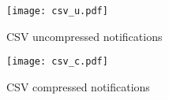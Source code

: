 
\begin{figure}
\noindent\begin{minipage}{.5\textwidth}
  \texttt{[image: csv\_u.pdf]}
  \captionsetup{width=0.9\textwidth}
  \caption{CSV uncompressed notifications}
  \label{figures:csv_u}
\end{minipage}%
\begin{minipage}{.5\textwidth}
  \texttt{[image: csv\_c.pdf]}
  \captionsetup{width=0.9\textwidth}
  \caption{CSV compressed notifications}
  \label{figures:csv_c}
\end{minipage}
\end{figure}

